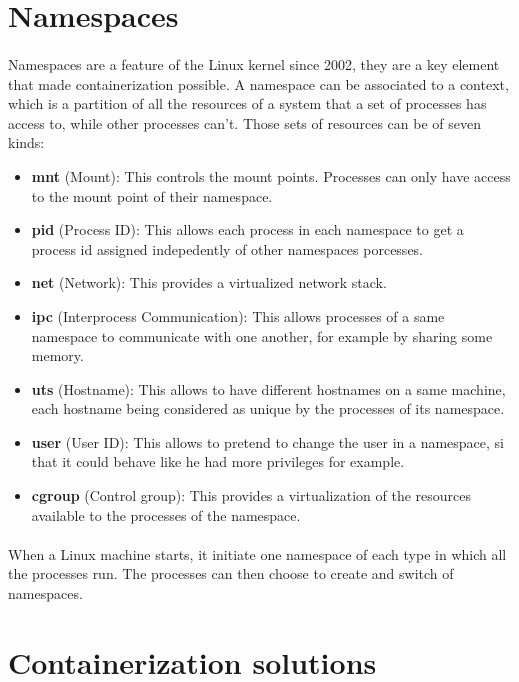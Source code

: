 \section{Namespaces}
\paragraph{}Namespaces are a feature of the Linux kernel since 2002, they are a key element that made containerization possible.  A namespace can be associated to a context, which is a partition of all the resources of a system that a set of processes has access to, while other processes can't.  Those sets of resources can be of seven kinds:
\begin{itemize}
\renewcommand\labelitemi{--}
  \item \textbf{mnt} (Mount): This controls the mount points.  Processes can only have access to the mount point of their namespace.
  \item \textbf{pid} (Process ID): This allows each process in each namespace to get a process id assigned indepedently of other namespaces porcesses.
  \item \textbf{net} (Network): This provides a virtualized network stack.
  \item \textbf{ipc} (Interprocess Communication): This allows processes of a same namespace to communicate with one another, for example by sharing some memory.
  \item \textbf{uts} (Hostname): This allows to have different hostnames on a same machine, each hostname being considered as unique by the processes of its namespace.
  \item \textbf{user} (User ID): This allows to pretend to change the user in a namespace, si that it could behave like he had more privileges for example.
  \item \textbf{cgroup} (Control group): This provides a virtualization of the resources available to the processes of the namespace.
\end{itemize}

\paragraph{}When a Linux machine starts, it initiate one namespace of each type in which all the processes run.  The processes can then choose to create and switch of namespaces.

\section{Containerization solutions}

